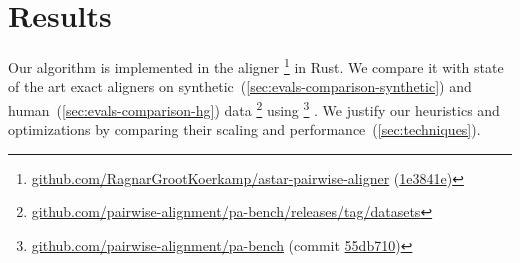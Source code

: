 \section{Results} \label{sec:evals}

Our algorithm is implemented in the aligner
\astarpa%
\footnote{\href{https://github.com/RagnarGrootKoerkamp/astar-pairwise-aligner}{github.com/RagnarGrootKoerkamp/astar-pairwise-aligner}
(\href{https://github.com/RagnarGrootKoerkamp/astar-pairwise-aligner/tree/1e3841e239093fc32ccc2eb3af1d2fe0da240b6e}{1e3841e})}
in Rust. We compare it with state of the art exact aligners on
synthetic~(\cref{sec:evals-comparison-synthetic}) and
human~(\cref{sec:evals-comparison-hg})
data%
\footnote{\href{https://github.com/pairwise-alignment/pa-bench/releases/tag/datasets}{github.com/pairwise-alignment/pa-bench/releases/tag/datasets}}
using \pabench%
\footnote{\href{https://github.com/pairwise-alignment/pa-bench}{github.com/pairwise-alignment/pa-bench}
(commit
\href{https://github.com/pairwise-alignment/pa-bench/commit/55db71002d6a0ef5623a231a8c19085e34712223}{55db710})}%
.
We justify our heuristics and optimizations by comparing their scaling and
performance~(\cref{sec:techniques}).







